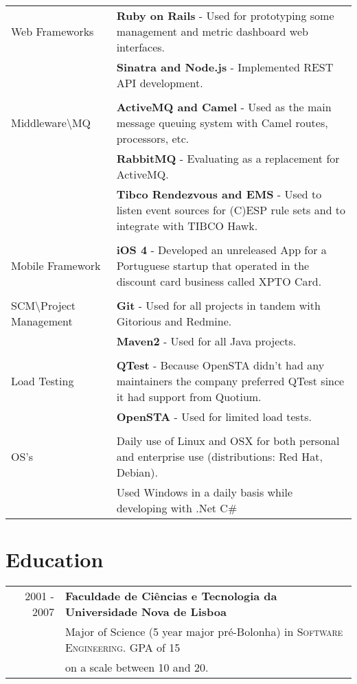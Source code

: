 \documentclass[a4paper,10pt]{article}
\begin{document}
\begin{tabular}{p{4cm}|p{9cm}}
	Web Frameworks
	& {\bf Ruby on Rails} - Used for prototyping some management and metric dashboard web interfaces. \\
	& {\bf Sinatra and Node.js} - Implemented REST API development. \\
\multicolumn{2}{c}{} \\
	Middleware\textbackslash MQ
	& {\bf ActiveMQ and Camel} - Used as the main message queuing system with Camel routes, processors, etc. \\
	& {\bf RabbitMQ} - Evaluating as a replacement for ActiveMQ. \\
	& {\bf Tibco Rendezvous and EMS} -  Used to listen event sources for (C)ESP rule sets and to integrate with TIBCO Hawk.\\
\multicolumn{2}{c}{} \\
	Mobile Framework
	&  {\bf iOS 4} - Developed an unreleased App for a Portuguese startup that operated in the discount card business called XPTO Card.\\
\multicolumn{2}{c}{} \\
	SCM\textbackslash Project Management
	& {\bf Git} - Used for all projects in tandem with Gitorious and Redmine. \\
	& {\bf Maven2} - Used for all Java projects.\\
\multicolumn{2}{c}{} \\
	Load Testing 
	& {\bf QTest} - Because OpenSTA didn't had any maintainers the company preferred QTest since it had support from Quotium. \\
	& {\bf OpenSTA} - Used for limited load tests. \\
\multicolumn{2}{c}{} \\ 
	OS's
	&  Daily use of Linux and OSX for both personal and enterprise use (distributions: Red Hat, Debian). \\
	&  Used Windows in a daily basis while developing with .Net C\#
\end{tabular}

\section{Education}
\begin{tabular}{rl}	
2001 - 2007 & \textbf{Faculdade de Ciências e Tecnologia da Universidade Nova de Lisboa}\\
 & Major of Science (5 year major pré-Bolonha) in \textsc{Software Engineering}. GPA of 15\\
 & on a scale between 10 and 20. \\
\end{tabular}
\end{document}
